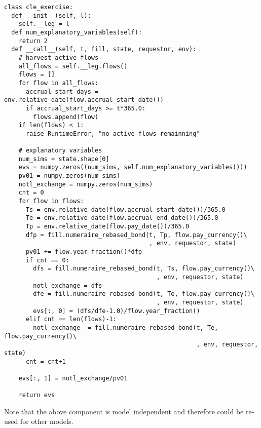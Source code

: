 \begin{verbatim}
class cle_exercise:
  def __init__(self, l):
    self.__leg = l
  def num_explanatory_variables(self):
    return 2
  def __call__(self, t, fill, state, requestor, env):
    # harvest active flows
    all_flows = self.__leg.flows()
    flows = []
    for flow in all_flows:
      accrual_start_days = env.relative_date(flow.accrual_start_date())
      if accrual_start_days >= t*365.0:
        flows.append(flow)
    if len(flows) < 1:
      raise RuntimeError, "no active flows remainning"

    # explanatory variables
    num_sims = state.shape[0]
    evs = numpy.zeros((num_sims, self.num_explanatory_variables()))
    pv01 = numpy.zeros(num_sims)
    notl_exchange = numpy.zeros(num_sims)
    cnt = 0 
    for flow in flows:
      Ts = env.relative_date(flow.accrual_start_date())/365.0        
      Te = env.relative_date(flow.accrual_end_date())/365.0        
      Tp = env.relative_date(flow.pay_date())/365.0
      dfp = fill.numeraire_rebased_bond(t, Tp, flow.pay_currency()\
                                        , env, requestor, state)
      pv01 += flow.year_fraction()*dfp
      if cnt == 0:
        dfs = fill.numeraire_rebased_bond(t, Ts, flow.pay_currency()\
                                          , env, requestor, state)
        notl_exchange = dfs
        dfe = fill.numeraire_rebased_bond(t, Te, flow.pay_currency()\
                                          , env, requestor, state)
        evs[:, 0] = (dfs/dfe-1.0)/flow.year_fraction()
      elif cnt == len(flows)-1:
        notl_exchange -= fill.numeraire_rebased_bond(t, Te, flow.pay_currency()\
                                                     , env, requestor, state)
      cnt = cnt+1 
      
    evs[:, 1] = notl_exchange/pv01

    return evs
\end{verbatim}
Note that the above component is model independent and therefore could
be re-used for other models.

